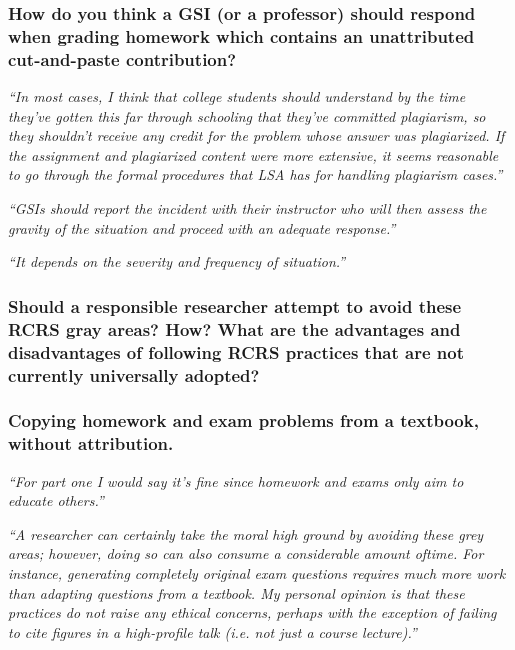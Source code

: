 \documentclass[12pt]{beamer}
\newcommand\ans[1]{{\it ``#1''}}
\begin{document}
\begin{frame} %
\frametitle{How do you think a GSI (or a professor) should respond when grading homework which contains an unattributed cut-and-paste contribution?}

\ans{In  most  cases,  I  think  that  college  students  should  understand  by  the  time  they've gotten this far through schooling that they've committed plagiarism, so they shouldn't receive any credit for the problem whose answer was plagiarized.  If the assignment and plagiarized content were more extensive, it seems reasonable to go through the formal procedures that LSA has for handling plagiarism cases.}

\ans{GSIs should report the incident with their instructor who will then assess the gravity of the situation and proceed with an adequate response.}

\ans{It depends on the severity and frequency of situation.}

\end{frame}

\begin{frame}  %
  \frametitle{Should a responsible researcher attempt to avoid these RCRS gray areas? How? What are the advantages and disadvantages of following RCRS practices that are not currently universally adopted?}

\end{frame}

\begin{frame}

\frametitle{Copying homework and exam problems from a textbook, without attribution.}

\ans{For part one I would say it's fine since homework and exams only aim to educate others.}

\end{frame}

\begin{frame}

\ans{A researcher can certainly take the moral high ground by avoiding these grey areas; however, doing so can also consume a considerable amount oftime.  For instance, generating completely original exam questions requires much more work than adapting questions from a textbook.  My personal opinion is that these practices do not raise any ethical concerns, perhaps with the exception of failing to cite figures in a high-profile talk (i.e.  not just a course lecture).}

\end{frame}
\end{document}
